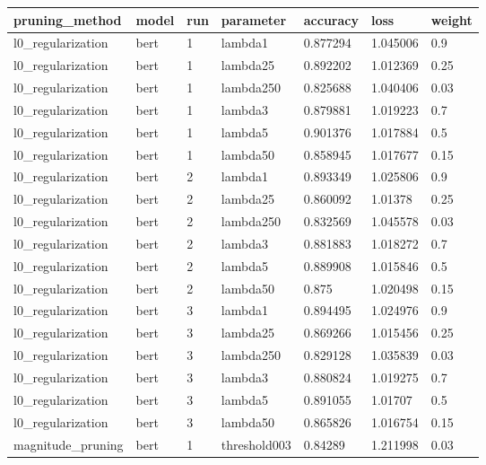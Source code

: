 \begin{tabular}{lllllll}
\toprule
       pruning\_method & model & run &    parameter &  accuracy &      loss & weight \\
\midrule
    l0\_regularization &  bert &   1 &      lambda1 &  0.877294 &  1.045006 &    0.9 \\
    l0\_regularization &  bert &   1 &     lambda25 &  0.892202 &  1.012369 &   0.25 \\
    l0\_regularization &  bert &   1 &    lambda250 &  0.825688 &  1.040406 &   0.03 \\
    l0\_regularization &  bert &   1 &      lambda3 &  0.879881 &  1.019223 &    0.7 \\
    l0\_regularization &  bert &   1 &      lambda5 &  0.901376 &  1.017884 &    0.5 \\
    l0\_regularization &  bert &   1 &     lambda50 &  0.858945 &  1.017677 &   0.15 \\
    l0\_regularization &  bert &   2 &      lambda1 &  0.893349 &  1.025806 &    0.9 \\
    l0\_regularization &  bert &   2 &     lambda25 &  0.860092 &   1.01378 &   0.25 \\
    l0\_regularization &  bert &   2 &    lambda250 &  0.832569 &  1.045578 &   0.03 \\
    l0\_regularization &  bert &   2 &      lambda3 &  0.881883 &  1.018272 &    0.7 \\
    l0\_regularization &  bert &   2 &      lambda5 &  0.889908 &  1.015846 &    0.5 \\
    l0\_regularization &  bert &   2 &     lambda50 &     0.875 &  1.020498 &   0.15 \\
    l0\_regularization &  bert &   3 &      lambda1 &  0.894495 &  1.024976 &    0.9 \\
    l0\_regularization &  bert &   3 &     lambda25 &  0.869266 &  1.015456 &   0.25 \\
    l0\_regularization &  bert &   3 &    lambda250 &  0.829128 &  1.035839 &   0.03 \\
    l0\_regularization &  bert &   3 &      lambda3 &  0.880824 &  1.019275 &    0.7 \\
    l0\_regularization &  bert &   3 &      lambda5 &  0.891055 &   1.01707 &    0.5 \\
    l0\_regularization &  bert &   3 &     lambda50 &  0.865826 &  1.016754 &   0.15 \\
    magnitude\_pruning &  bert &   1 & threshold003 &   0.84289 &  1.211998 &   0.03 \\

\end{tabular}
